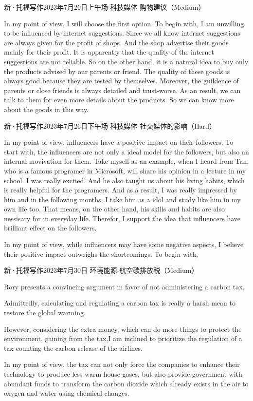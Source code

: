 新·托福写作2023年7月26日上午场 科技媒体-购物建议（Medium）

In my point of view, I will choose the first option. To begin with, I am unwilling to be influenced by internet suggestions. Since we all know internet suggestions are always given for the profit of shops. And the shop advertise their goods mainly for their profit. It is apparently that the quality of the internet suggestions are not reliable. So on the other hand, it is a natural idea to buy only the products advised by our parents or friend. The quality of these goods is always good because they are tested by themselves. Moreover, the guildence of parents or close friends is always detailed and trust-worse. As an result, we can talk to them for even more details about the products. So we can know more about the goods in this way.


新·托福写作2023年7月26日下午场 科技媒体-社交媒体的影响（Hard）

In my point of view, influencers have a positive impact on their followers. To start with, the influencers are not only a ideal model for the followers, but also an internal movivation for them. Take myself as an example, when I heard from Tan, who is a famous programer in Microsoft, will share his opinion in a lecture in my school. I was really excited. And he also taught us about his living habits, which is really helpful for the programers. And as a result, I was really impressed by him and in the following months, I take him as a idol and study like him in my own life too. That means, on the other hand, his skills and habits are also nessisary for in everyday life. Therefor, I support the idea that influencers have brilliant effect on the followers.


In my point of view, while influencers may have some negative aspects, I believe their positive impact outweighs the shortcomings. To begin with,


新·托福写作2023年7月30日 环境能源-航空碳排放税（Medium）

Rory presents a convincing argument in favor of not administering a carbon tax.

Admittedly, calculating and regulating a carbon tax is really a harsh mean to restore the global warming.

However, considering the extra money, which can do more things to protect the environment, gaining from the tax,I am inclined to prioritize the regulation of a tax counting the carbon release of the airlines.

In my point of view, the tax can not only force the companies to enhance their technology to produce less warm house gases, but also provide government with abundant funds to transform the carbon dioxide which already exists in the air to oxygen and water using chemical changes.

